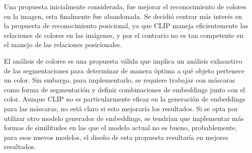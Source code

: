 Una propuesta inicialmente considerada, fue mejorar el reconocimiento de colores en la imagen, esta finalmente fue abandonada. Se decidió centrar más interés en la propuesta de reconocimiento posicional, ya que CLIP maneja eficientemente las relaciones de colores en las imágenes, y por el contrario no es tan competente en el manejo de las relaciones posicionales.

El análisis de colores es una propuesta válida que implica un análisis exhaustivo de las segmentaciones para determinar de manera óptima a qué objeto pertenece un color. Sin embargo, para implementarlo, se requiere trabajar con máscaras como forma de segmentación y definir combinaciones de embeddings junto con el color. Aunque CLIP no es particularmente eficaz en la generación de embeddings para las máscaras, no está claro si esto mejoraría los resultados. Si se opta por utilizar otro modelo generador de embeddings, se tendrían que implementar más formas de similitudes en las que el modelo actual no es bueno, probablemente, para esos nuevos modelos, el dise\~no de esta propuesta resultaría en mejores resultados.


